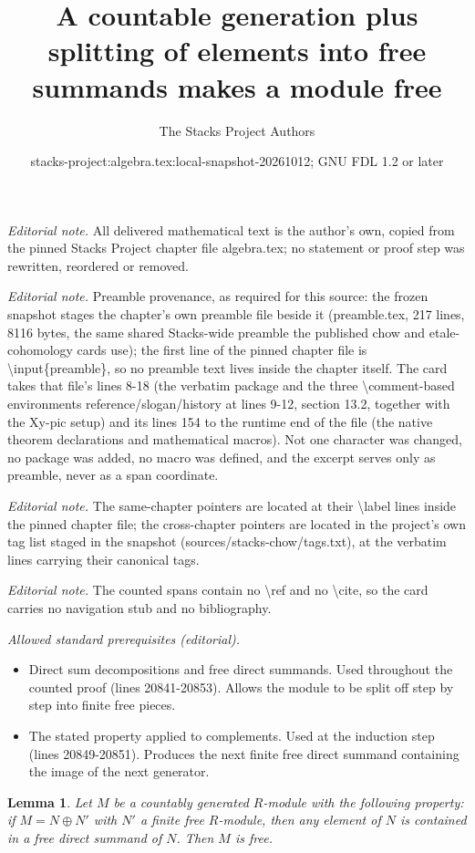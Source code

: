 \documentclass[10pt,a4paper]{amsart}
\title{A countable generation plus splitting of elements into free summands makes a module free}
\author{The Stacks Project Authors}
\date{stacks-project:algebra.tex:local-snapshot-20261012; GNU FDL 1.2 or later}
\theoremstyle{plain}
\newtheorem{lemma}[subsection]{Lemma}
\theoremstyle{definition}
\theoremstyle{remark}
\numberwithin{equation}{subsection}
\begin{document}
\maketitle
\noindent\textit{Editorial note.} All delivered mathematical text is the author's own, copied from the pinned Stacks Project chapter file algebra.tex; no statement or proof step was rewritten, reordered or removed.\par\medskip
\noindent\textit{Editorial note.} Preamble provenance, as required for this source: the frozen snapshot stages the chapter's own preamble file beside it (preamble.tex, 217 lines, 8116 bytes, the same shared Stacks-wide preamble the published chow and etale-cohomology cards use); the first line of the pinned chapter file is \textbackslash{}input\{preamble\}, so no preamble text lives inside the chapter itself. The card takes that file's lines 8-18 (the verbatim package and the three \textbackslash{}comment-based environments reference/slogan/history at lines 9-12, section 13.2, together with the Xy-pic setup) and its lines 154 to the runtime end of the file (the native theorem declarations and mathematical macros). Not one character was changed, no package was added, no macro was defined, and the excerpt serves only as preamble, never as a span coordinate.\par\medskip
\noindent\textit{Editorial note.} The same-chapter pointers are located at their \textbackslash{}label lines inside the pinned chapter file; the cross-chapter pointers are located in the project's own tag list staged in the snapshot (sources/stacks-chow/tags.txt), at the verbatim lines carrying their canonical tags.\par\medskip
\noindent\textit{Editorial note.} The counted spans contain no \textbackslash{}ref and no \textbackslash{}cite, so the card carries no navigation stub and no bibliography.\par\medskip
\noindent\textit{Allowed standard prerequisites (editorial).}\begin{itemize}
\item Direct sum decompositions and free direct summands. Used throughout the counted proof (lines 20841-20853). Allows the module to be split off step by step into finite free pieces.
\item The stated property applied to complements. Used at the induction step (lines 20849-20851). Produces the next finite free direct summand containing the image of the next generator.
\end{itemize}\medskip
\begin{lemma}
\label{lemma-freeness-criteria}
Let $M$ be a countably generated $R$-module with the following property:
if $M = N \oplus N'$ with $N'$ a finite free $R$-module, then
any element of $N$ is contained in a free direct summand of $N$.
Then $M$ is free.
\end{lemma}
\end{document}

